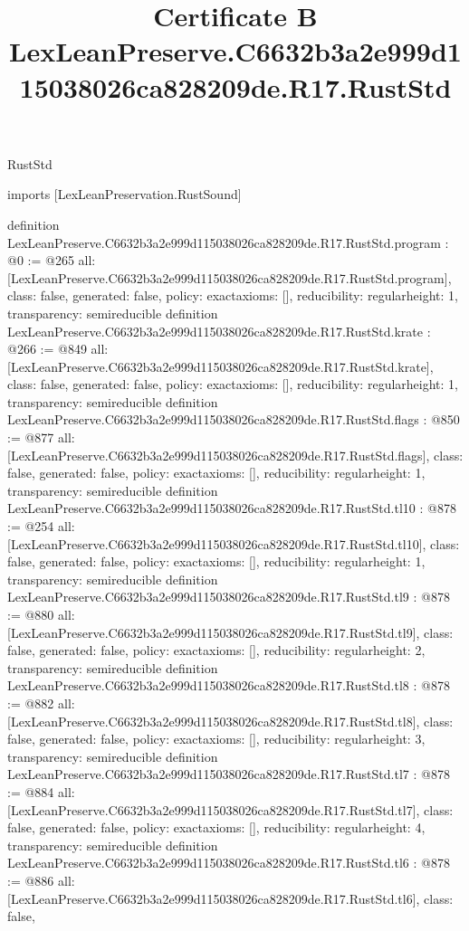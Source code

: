 \begin{lexlean}{RustStd}
\title{Certificate B LexLeanPreserve.C6632b3a2e999d115038026ca828209de.R17.RustStd}
\begin{coremodule}
imports [LexLeanPreservation.RustSound]

definition LexLeanPreserve.C6632b3a2e999d115038026ca828209de.R17.RustStd.program : @0 := @265 {
  all: [LexLeanPreserve.C6632b3a2e999d115038026ca828209de.R17.RustStd.program],
  class: false,
  generated: false,
  policy: exact{axioms: []},
  reducibility: regular{height: 1},
  transparency: semireducible
}
definition LexLeanPreserve.C6632b3a2e999d115038026ca828209de.R17.RustStd.krate : @266 := @849 {
  all: [LexLeanPreserve.C6632b3a2e999d115038026ca828209de.R17.RustStd.krate],
  class: false,
  generated: false,
  policy: exact{axioms: []},
  reducibility: regular{height: 1},
  transparency: semireducible
}
definition LexLeanPreserve.C6632b3a2e999d115038026ca828209de.R17.RustStd.flags : @850 := @877 {
  all: [LexLeanPreserve.C6632b3a2e999d115038026ca828209de.R17.RustStd.flags],
  class: false,
  generated: false,
  policy: exact{axioms: []},
  reducibility: regular{height: 1},
  transparency: semireducible
}
definition LexLeanPreserve.C6632b3a2e999d115038026ca828209de.R17.RustStd.tl10 : @878 := @254 {
  all: [LexLeanPreserve.C6632b3a2e999d115038026ca828209de.R17.RustStd.tl10],
  class: false,
  generated: false,
  policy: exact{axioms: []},
  reducibility: regular{height: 1},
  transparency: semireducible
}
definition LexLeanPreserve.C6632b3a2e999d115038026ca828209de.R17.RustStd.tl9 : @878 := @880 {
  all: [LexLeanPreserve.C6632b3a2e999d115038026ca828209de.R17.RustStd.tl9],
  class: false,
  generated: false,
  policy: exact{axioms: []},
  reducibility: regular{height: 2},
  transparency: semireducible
}
definition LexLeanPreserve.C6632b3a2e999d115038026ca828209de.R17.RustStd.tl8 : @878 := @882 {
  all: [LexLeanPreserve.C6632b3a2e999d115038026ca828209de.R17.RustStd.tl8],
  class: false,
  generated: false,
  policy: exact{axioms: []},
  reducibility: regular{height: 3},
  transparency: semireducible
}
definition LexLeanPreserve.C6632b3a2e999d115038026ca828209de.R17.RustStd.tl7 : @878 := @884 {
  all: [LexLeanPreserve.C6632b3a2e999d115038026ca828209de.R17.RustStd.tl7],
  class: false,
  generated: false,
  policy: exact{axioms: []},
  reducibility: regular{height: 4},
  transparency: semireducible
}
definition LexLeanPreserve.C6632b3a2e999d115038026ca828209de.R17.RustStd.tl6 : @878 := @886 {
  all: [LexLeanPreserve.C6632b3a2e999d115038026ca828209de.R17.RustStd.tl6],
  class: false,
}
\end{coremodule}
\end{lexlean}
